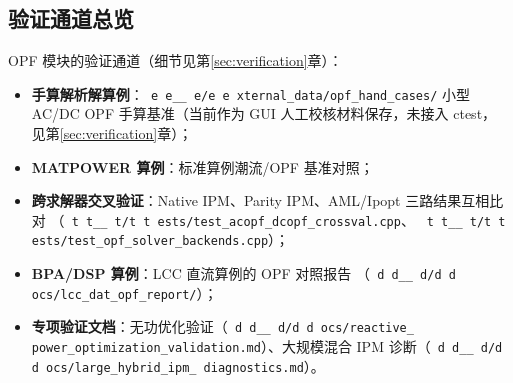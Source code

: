 \documentclass[UTF8,fontset=windows,a4paper,11pt]{ctexart}
\makeatletter
\newcommand{\srcpath}[1]{\texttt{\src@scan#1\src@stop}}
\def\src@scan#1{%
  \ifx#1\src@stop
  \else
    \ifx#1\_\_\allowbreak\else
    \ifx#1/#1\allowbreak\else
    #1\fi\fi
    \expandafter\src@scan
  \fi}
\makeatother
\begin{document}
\subsection{验证通道总览}
OPF 模块的验证通道（细节见第\ref{sec:verification}章）：
\begin{itemize}
  \item \textbf{手算解析解算例}：\srcpath{external\_data/opf\_hand\_cases/} 小型
        AC/DC OPF 手算基准（当前作为 GUI 人工校核材料保存，未接入 ctest，
        见第\ref{sec:verification}章）；
  \item \textbf{MATPOWER 算例}：标准算例潮流/OPF 基准对照；
  \item \textbf{跨求解器交叉验证}：Native IPM、Parity IPM、AML/Ipopt 三路结果互相比对
        （\srcpath{tests/test\_acopf\_dcopf\_crossval.cpp}、
        \srcpath{tests/test\_opf\_solver\_backends.cpp}）；
  \item \textbf{BPA/DSP 算例}：LCC 直流算例的 OPF 对照报告
        （\srcpath{docs/lcc\_dat\_opf\_report/}）；
  \item \textbf{专项验证文档}：无功优化验证（\srcpath{docs/reactive\_\allowbreak
        power\_\allowbreak optimization\_\allowbreak validation.md}）、大规模混合 IPM
        诊断（\srcpath{docs/large\_\allowbreak hybrid\_\allowbreak ipm\_\allowbreak
        diagnostics.md}）。
\end{itemize}

\newpage









\end{document}
